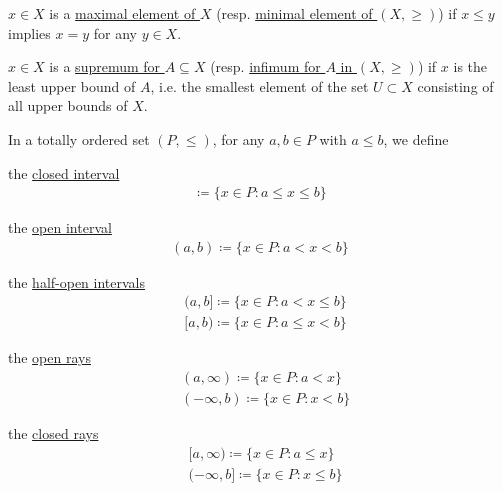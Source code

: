 \begin{definition}
\begin{defenum}
    \item\label{def:poset/maximal_minimal_element}\cite[170]{Enderton1977} $x \in X$ is a \ul{maximal element of $X$} (resp. \ul{minimal element of $(X, \geq)$}) if $x \leq y$ implies $x = y$ for any $y \in X$.

    \item\label{def:poset/supremum_infimum}\cite[170]{Enderton1977} $x \in X$ is a \ul{supremum for $A \subseteq X$} (resp. \ul{infimum for $A$ in $(X, \geq)$}) if $x$ is the least upper bound of $A$, i.e. the smallest element of the set $U \subset X$ consisting of all upper bounds of $X$.
  \end{defenum}
\end{definition}

\begin{definition}\label{def:total_order_interval}\cite{nLab:order_topology}
  In a totally ordered set $(P, \leq)$, for any $a, b \in P$ with $a \leq b$, we define
  \begin{defenum}
    \item\label{def:total_order_interval/closed} the \ul{closed interval}
    \begin{align*}
      [a, b] \coloneqq \{ x \in P \colon a \leq x \leq b \}
    \end{align*}

    \item\label{def:total_order_interval/open} the \ul{open interval}
    \begin{align*}
      (a, b) \coloneqq \{ x \in P \colon a < x < b \}
    \end{align*}

    \item\label{def:total_order_interval/half_open} the \ul{half-open intervals}
    \begin{align*}
      &(a, b] \coloneqq \{ x \in P \colon a < x \leq b \}
      \\
      &[a, b) \coloneqq \{ x \in P \colon a \leq x < b \}
    \end{align*}

    \item\label{def:total_order_interval/open_ray} the \ul{open rays}
    \begin{align*}
      &(a, \infty) \coloneqq \{ x \in P \colon a < x \}
      \\
      &(-\infty, b) \coloneqq \{ x \in P \colon x < b \}
    \end{align*}

    \item\label{def:total_order_interval/closed_ray} the \ul{closed rays}
    \begin{align*}
      &[a, \infty) \coloneqq \{ x \in P \colon a \leq x \}
      \\
      &(-\infty, b] \coloneqq \{ x \in P \colon x \leq b \}
    \end{align*}
  \end{defenum}
\end{definition}

